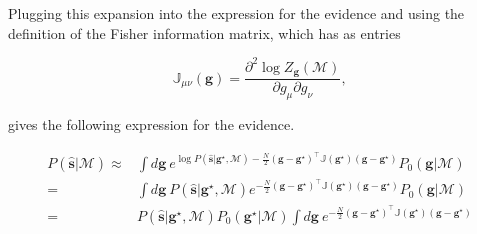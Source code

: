 \noindent
Plugging this expansion into the expression for the evidence and using the definition of the Fisher information matrix, which has as entries

\begin{equation}
    \mathbb{J}_{\mu\nu}(\mathbf{g}) = \frac{\partial^2 \log {Z_\mathbf{g}(\mathcal{M})}}{\partial g_\mu \partial g_\nu},
\end{equation}

\noindent
gives the following expression for the evidence.

\begin{align*}
    P(\mathbf{\hat{s}}|\mathcal{M}) \approx& \int d\mathbf{g} \: e^{\log P(\mathbf{\hat{s}} | \mathbf{g}^\star, \mathcal{M}) - \frac{N}{2}  (\mathbf{g} - \mathbf{g}^\star)^\intercal \mathbb{J} (\mathbf{g}^\star) (\mathbf{g} - \mathbf{g}^\star)} P_0(\mathbf{g}|\mathcal{M}) \\
   =& \int d\mathbf{g} \: P(\mathbf{\hat{s}} | \mathbf{g}^\star, \mathcal{M})  e^{-\frac{N}{2}  (\mathbf{g} - \mathbf{g}^\star)^\intercal \mathbb{J} (\mathbf{g}^\star) (\mathbf{g} - \mathbf{g}^\star)} P_0(\mathbf{g}|\mathcal{M}) \\
   =& P(\mathbf{\hat{s}} | \mathbf{g}^\star, \mathcal{M}) P_0(\mathbf{g}^\star|\mathcal{M}) \int d\mathbf{g} \: e^{-\frac{N}{2}  (\mathbf{g} - \mathbf{g}^\star)^\intercal \mathbb{J} (\mathbf{g}^\star) (\mathbf{g} - \mathbf{g}^\star)} \\
\end{align*}

